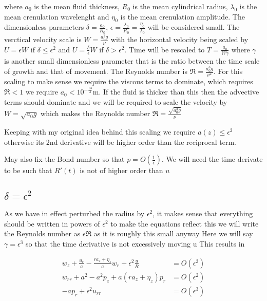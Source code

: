 \documentclass[12pt]{article}
\begin{document}
where $a_0$ is the mean fluid thickness, $R_0$ is the mean cylindrical radius, $\lambda_0$ is the mean crenulation wavelenght and $\eta_0$ is the mean crenulation amplitude. The dimensionless parameters $\delta = \frac{a_0}{R_0}$, $\epsilon = \frac{\lambda_0}{R_0} = \frac{\eta_0}{\lambda_0}$ will be considered small. The verctical velocity scale is $W = \frac{a_0^2 g}{\nu}$ with the horizontal velocity being scaled by $U = \epsilon W$ if $\delta\le\epsilon^2$ and $U = \frac{\delta}{\epsilon}W$ if $\delta>\epsilon^2$. Time will be rescaled to $T = \frac{a_0}{W \gamma}$ where $\gamma$ is another small dimensionless parameter that is the ratio between the time scale of growth and that of movement. The Reynolds number is $\Re = \frac{a_0^3  g}{\nu^2}$. For this scaling to make sense we require the viscous terms to dominate, which requires $\Re<1$ we require $a_0< 10^{-\frac{13}{3}} \mathrm{m}$. If the fluid is thicker than this then the advective terms should dominate and we will be required to scale the velocity by $ W = \sqrt{a_0 g}$ which makes the Reynolds number $\Re = \frac{\sqrt{a_0^3 g}}{\nu}$

Keeping with my original idea behind this scaling we require $a(z) \le \epsilon^2$ otherwise its 2nd derivative will be higher order than the reciprocal term.

May also fix the Bond number so that $ p = O(\frac{1}{\epsilon})$. We will need the time derivate to be such that $R'(t)$ is not of higher order than $u$
\subsection{$\delta = \epsilon^2$}
As we have in effect perturbed the radius by $\epsilon^2$, it makes sense that everything should be written in powers of $\epsilon^2$ to make the equations reflect this we will write the Reynolds number as $\epsilon\Re$ as it is roughly this small anyway
Here we will say $\gamma = \epsilon^3$ so that the time derivative is not excessively moving u
 This results in

\begin{align}
w_z + \frac{u_r}{a} - \frac{r a_z +\eta_z}{a} w_r+ \epsilon^2 \frac{u}{R}&= O(\epsilon^3)\\
w_{rr} + a^2 - a^2 p_z +a(ra_z + \eta_z)p_r&=O(\epsilon^2)\\
-ap_r + \epsilon^2 u_{rr} &= O(\epsilon^3)
\end{align}
\end{document}
